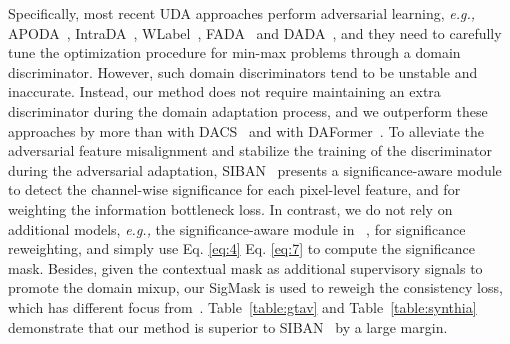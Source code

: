 \documentclass[journal]{IEEEtran}
\begin{document}
{\begin{minipage}{\textwidth}
Specifically, most recent UDA approaches perform adversarial learning, \emph{e.g.,} APODA~\cite{APODA}, IntraDA~\cite{IntraDA}, WLabel~\cite{WLabel}, FADA~\cite{FADA} and DADA~\cite{DADA}, and they need to carefully tune the optimization procedure for min-max problems through a domain discriminator. However, such domain discriminators tend to be unstable and inaccurate. Instead, our method does not require maintaining an extra discriminator during the domain adaptation process, and we outperform these approaches by more than  with DACS~\cite{tranheden2020dacs} and  with DAFormer~\cite{hoyer2022daformer}. 
To alleviate the adversarial feature misalignment and stabilize the training of the discriminator during the adversarial adaptation, SIBAN~\cite{SIBAN} presents a significance-aware module to detect the channel-wise significance for each pixel-level feature, and for weighting the information bottleneck loss. In contrast, we do not rely on additional models, \emph{e.g.,} the significance-aware module in ~\cite{SIBAN}, for significance reweighting, and simply use Eq. \ref{eq:4}  Eq. \ref{eq:7} to compute the significance mask. Besides, given the contextual mask  as additional supervisory signals to promote the domain mixup, our SigMask is used to reweigh the consistency loss, which has different focus from~\cite{SIBAN}. Table~\ref{table:gtav} and Table~\ref{table:synthia} demonstrate that our method is superior to SIBAN~\cite{SIBAN} by a large margin.


\end{minipage}}
\end{document}

